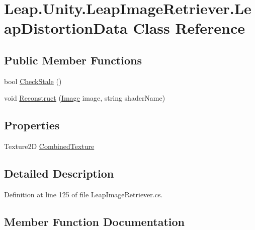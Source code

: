 \hypertarget{class_leap_1_1_unity_1_1_leap_image_retriever_1_1_leap_distortion_data}{}\section{Leap.\+Unity.\+Leap\+Image\+Retriever.\+Leap\+Distortion\+Data Class Reference}
\label{class_leap_1_1_unity_1_1_leap_image_retriever_1_1_leap_distortion_data}
\subsection*{Public Member Functions}
\begin{DoxyCompactItemize}
\item 
bool \mbox{\hyperlink{class_leap_1_1_unity_1_1_leap_image_retriever_1_1_leap_distortion_data_a8774adce171f0e03d584a8e23d2a03b3}{Check\+Stale}} ()
\item 
void \mbox{\hyperlink{class_leap_1_1_unity_1_1_leap_image_retriever_1_1_leap_distortion_data_a43ed92a4bbf4858983367f3731e8cd48}{Reconstruct}} (\mbox{\hyperlink{class_leap_1_1_image}{Image}} image, string shader\+Name)
\end{DoxyCompactItemize}
\subsection*{Properties}
\begin{DoxyCompactItemize}
\item 
Texture2D \mbox{\hyperlink{class_leap_1_1_unity_1_1_leap_image_retriever_1_1_leap_distortion_data_a70f9b9095b4ea4ca2634e29d7a41b722}{Combined\+Texture}}
\end{DoxyCompactItemize}


\subsection{Detailed Description}


Definition at line 125 of file Leap\+Image\+Retriever.\+cs.



\subsection{Member Function Documentation}
\mbox{\label{class_leap_1_1_unity_1_1_leap_image_retriever_1_1_leap_distortion_data_a8774adce171f0e03d584a8e23d2a03b3}} 
